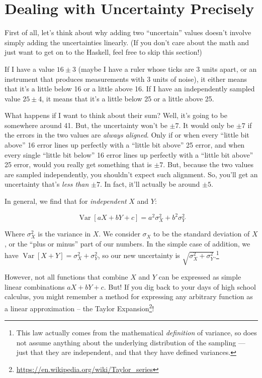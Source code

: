 \documentclass[]{article}
\renewcommand{\href}[2]{#2\footnote{\url{#1}}}
\begin{document}
\section{Dealing with Uncertainty
Precisely}\label{dealing-with-uncertainty-precisely}

First of all, let's think about why adding two ``uncertain'' values doesn't
involve simply adding the uncertainties linearly. (If you don't care about the
math and just want to get on to the Haskell, feel free to skip this section!)

If I have a value \(16 \pm 3\) (maybe I have a ruler whose ticks are 3 units
apart, or an instrument that produces measurements with 3 units of noise), it
either means that it's a little below 16 or a little above 16. If I have an
independently sampled value \(25 \pm 4\), it means that it's a little below 25
or a little above 25.

What happens if I want to think about their sum? Well, it's going to be
somewhere around 41. But, the uncertainty won't be \(\pm 7\). It would only be
\(\pm 7\) if the errors in the two values are \emph{always aligned}. Only if or
when every ``little bit above'' 16 error lines up perfectly with a ``little bit
above'' 25 error, and when every single ``little bit below'' 16 error lines up
perfectly with a ``little bit above'' 25 error, would you really get something
that is \(\pm 7\). But, because the two values are sampled independently, you
shouldn't expect such alignment. So, you'll get an uncertainty that's \emph{less
than} \(\pm 7\). In fact, it'll actually be around \(\pm 5\).

In general, we find that for \emph{independent} \(X\) and \(Y\):

\[
\operatorname{Var}[aX + bY + c] = a^2 \sigma_X^2 + b^2 \sigma_Y^2
\]

Where \(\sigma_X^2\) is the variance in \(X\). We consider \(\sigma_X\) to be
the standard deviation of \(X\), or the ``plus or minus'' part of our numbers.
In the simple case of addition, we have
\(\operatorname{Var}[X + Y] = \sigma_X^2 + \sigma_Y^2\), so our new uncertainty
is \(\sqrt{\sigma_X^2 + \sigma_Y^2}\).\footnote{This law actually comes from the
  mathematical \emph{definition} of variance, so does not assume anything about
  the underlying distribution of the sampling --- just that they are
  independent, and that they have defined variances.}

However, not all functions that combine \(X\) and \(Y\) can be expressed as
simple linear combinations \(aX + bY + c\). But! If you dig back to your days of
high school calculus, you might remember a method for expressing any arbitrary
function as a linear approximation -- the
\href{https://en.wikipedia.org/wiki/Taylor_series}{Taylor Expansion}!
\end{document}
